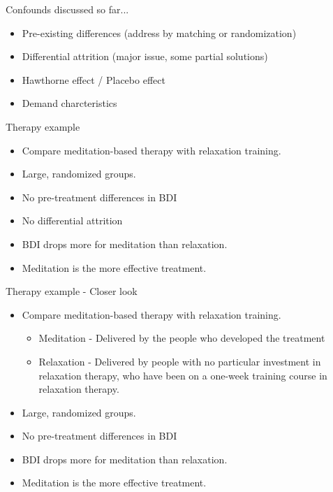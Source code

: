 \documentclass{beamer}
\begin{document}
\begin{frame}{Confounds discussed so far...}
	\begin{itemize}
		\item Pre-existing differences (address by matching or randomization)
		\item Differential attrition (major issue, some partial solutions)
		\item Hawthorne effect / Placebo effect
		\item Demand charcteristics
	\end{itemize}
\end{frame}
		
\begin{frame}{Therapy example}
\begin{itemize}
\item Compare meditation-based therapy with relaxation training.
\item Large, randomized groups.
\item No pre-treatment differences in BDI
\item No differential attrition
\item BDI drops more for meditation than relaxation.
\item Meditation is the more effective treatment.
\end{itemize}
\end{frame}

\begin{frame}{Therapy example - Closer look}
\begin{itemize}
\item Compare meditation-based therapy with relaxation training.
\begin{itemize}
\item Meditation - Delivered by the people who developed the treatment
\item Relaxation - Delivered by people with no particular investment in relaxation therapy, who have been on a one-week training course in relaxation therapy.
\end{itemize}
\item Large, randomized groups.
\item No pre-treatment differences in BDI
\item BDI drops more for meditation than relaxation.
\item Meditation is the more effective treatment.
\end{itemize}
\end{frame}
\end{document}
